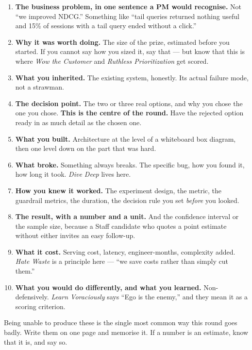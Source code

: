 \documentclass[10pt,twoside]{book}
\newcommand{\csection}[1]{\par\vspace{13pt}\noindent{\sffamily\large\bfseries\color{ink}\raggedright #1\par}\vspace{4pt}}
\begin{document}
\begin{enumerate}
\item \textbf{The business problem, in one sentence a PM would recognise.} Not ``we improved NDCG.'' Something like ``tail queries returned nothing useful and 15\% of sessions with a tail query ended without a click.''
\item \textbf{Why it was worth doing.} The size of the prize, estimated before you started. If you cannot say how you sized it, say that --- but know that this is where \textit{Wow the Customer} and \textit{Ruthless Prioritization} get scored.
\item \textbf{What you inherited.} The existing system, honestly. Its actual failure mode, not a strawman.
\item \textbf{The decision point.} The two or three real options, and why you chose the one you chose. \textbf{This is the centre of the round.} Have the rejected option ready in as much detail as the chosen one.
\item \textbf{What you built.} Architecture at the level of a whiteboard box diagram, then one level down on the part that was hard.
\item \textbf{What broke.} Something always breaks. The specific bug, how you found it, how long it took. \textit{Dive Deep} lives here.
\item \textbf{How you knew it worked.} The experiment design, the metric, the guardrail metrics, the duration, the decision rule you set \textit{before} you looked.
\item \textbf{The result, with a number and a unit.} And the confidence interval or the sample size, because a Staff candidate who quotes a point estimate without either invites an easy follow-up.
\item \textbf{What it cost.} Serving cost, latency, engineer-months, complexity added. \textit{Hate Waste} is a principle here --- ``we save costs rather than simply cut them.''
\item \textbf{What you would do differently, and what you learned.} Non-defensively. \textit{Learn Voraciously} says ``Ego is the enemy,'' and they mean it as a scoring criterion.
\end{enumerate}
\csection{The numbers you must know cold}
Being unable to produce these is the single most common way this round goes badly. Write them on one page and memorise it. If a number is an estimate, know that it is, and say so.\par
\end{document}
